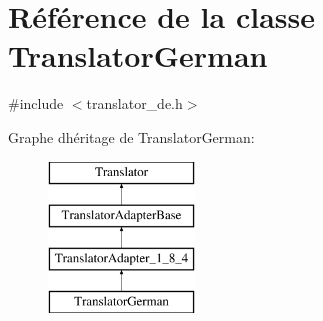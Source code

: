 \hypertarget{class_translator_german}{}\section{Référence de la classe Translator\+German}
\label{class_translator_german}


{\ttfamily \#include $<$translator\+\_\+de.\+h$>$}

Graphe d\textquotesingle{}héritage de Translator\+German\+:\begin{figure}[H]
\begin{center}
\leavevmode
\includegraphics[height=4.000000cm]{class_translator_german}
\end{center}
\end{figure}
